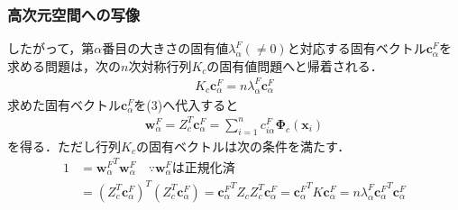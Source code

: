 \documentclass[dvipdfmx,cjk]{beamer}
\theoremstyle{example}
\begin{document}
\begin{frame}
    \frametitle{高次元空間への写像}
    したがって，第$\alpha$番目の大きさの固有値$\lambda_\alpha^F(\neq0)$と対応する固有ベクトル$\boldsymbol{c}_\alpha^F$を求める問題は，次の$n$次対称行列$K_c$の固有値問題へと帰着される．
    \begin{align*}
        K_c\boldsymbol{c}_\alpha^F=n\lambda_\alpha^F\boldsymbol{c}_\alpha^F
    \end{align*}
    求めた固有ベクトル$\boldsymbol{c}_\alpha^F$を(3)へ代入すると
    \begin{align*}
        \boldsymbol{w}_\alpha^F=Z_c^T\boldsymbol{c}_\alpha^F=\sum_{i=1}^{n}c_{i\alpha}^F\boldsymbol{\Phi}_c(\boldsymbol{x}_i)
    \end{align*}
    を得る．ただし行列$K_c$の固有ベクトルは次の条件を満たす．
    \begin{align*}
        1 & ={\boldsymbol{w}_\alpha^F}^T\boldsymbol{w}_\alpha^F\quad \because\text{$\boldsymbol{w}_\alpha^F$は正規化済}                                                                                                                                             \\
          & =(Z_c^T\boldsymbol{c}_\alpha^F)^T(Z_c^T\boldsymbol{c}_\alpha^F)={\boldsymbol{c}_\alpha^F}^TZ_cZ_c^T\boldsymbol{c}_\alpha^F={\boldsymbol{c}_\alpha^F}^TK\boldsymbol{c}_\alpha^F=n\lambda_\alpha^F{\boldsymbol{c}_\alpha^F}^T\boldsymbol{c}_\alpha^F
    \end{align*}
\end{frame}
\end{document}
